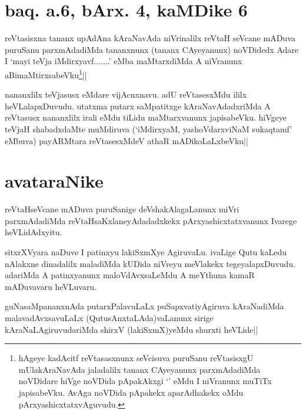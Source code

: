 \section*{baq. a.6, bArx. 4, kaMDike 6}

\stext

\begin{artha}
reVtasisxna tananx upAdAna kAraNavAda niVrinalilx reVtaH seVcane 
mADuva puruSanu parxmAdadiMda tananxnunx (tananx CAyeyanunx) noVDidedx 
Adare I `mayi teVja iMdirxyavf.......' eMba maMtarxdiMda A niVranunx 
aBimaMtirxsabeVku\footnote[2]{hAgeye kadAcitf reVtasasxnunx seVcisuva 
puruSanu reVtasisxgU mUlakAraNavAda jaladalilx tananx CAyeyanunx 
parxmAdadiMda noVDidare hiVge noVDida pApakAkxgi `\stext' eMdu I 
niVranunx muTiTx japisabeVku. AvAga noVDida pApakekx aparAdhakekx oMdu 
pArxyashicxtatxvAguvudu.}||
\end{artha}


\begin{artha}
nananxlilx teVjasusx eMdare vijAcnxnavu. adU reVtasesxMdu ililx 
heVLalapxDuvudu. utatxma putarx saMpatitxge kAraNavAdadxriMda A 
reVtasusx nananxlilx irali eMdu tiLidu maMtarxvanunx japisabeVku. 
hiVgeye teVjaH shabadxdaMte muMdiruva (`iMdirxyaM, yashoVdarxviNaM 
sukaqtamf' eMbuva) payARMtara reVtasesxMdeV athaR mADikoLaLxbeVku||
\end{artha}

\section*{avataraNike}
reVtaHseVcane mADuva puruSanige deVshakAlagaLanunx miVri parxmAdadiMda 
reVtaHsaKxlaneyAdadadxkekx pArxyashicxtatxvanunx Ivarege heVLidAdxyitu.


\begin{artha}
sitxrXVyara naDuve I patinxyu lakiSxmXye AgiruvaLu. ivaLige Qutu 
kaLedu nAlakxne dinadalilx maladiMda kUDida niVreyu meVlakekx 
tegeyalapxDuvudu. adariMda A patinxyanunx maloVdAvxsaLeMdu A meYthuna 
kamaR mADuvavaru heVLuvaru.
\end{artha}


\begin{artha}
guNasaMpananxnAda putarxPalavuLaLx puSapxvatiyAgiruva kAraNadiMda 
malavadAvxsavuLaLx (QutusAnxtaLAda)vaLanunx sirige 
kAraNaLAgiruvudariMda shirxV (lakiSxmX)yeMdu shurxti heVLide|| 
\end{artha}

